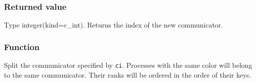 \subsubsection*{Returned value}
Type integer(kind=c\_int). Returns the index of the new  communicator.


\subsubsection*{Function}
Split the communicator specified by  {\tt ci}.
Processes with the same color will belong to the same
communicator. Their ranks will be ordered in the order of their keys.




\clearpage






